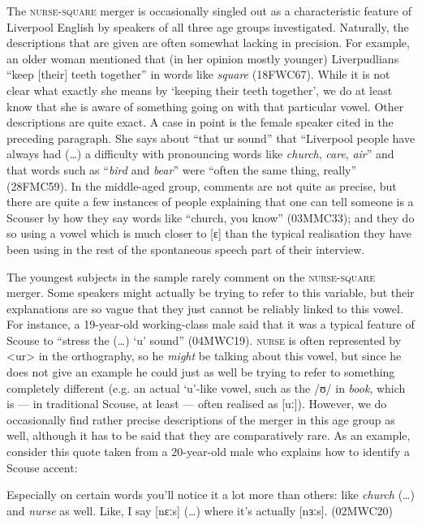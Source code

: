 The \textsc{nurse}-\textsc{square} merger is occasionally singled out as a characteristic feature of Liverpool English by speakers of all three age groups investigated.
Naturally, the descriptions that are given are often somewhat lacking in precision.
For example, an older woman mentioned that (in her opinion mostly younger) Liverpudlians ``keep [their] teeth together'' in words like \emph{square} (18FWC67).
While it is not clear what exactly she means by `keeping their teeth together', we do at least know that she is aware  of something going on with that particular vowel.
Other descriptions are quite exact.
A case in point is the female speaker cited in the preceding paragraph.
She says about ``that ur sound'' that  ``Liverpool people have always had (\ldots) a difficulty with pronouncing words like \emph{church}, \emph{care}, \emph{air}'' and that words such as ``\emph{bird} and \emph{bear}'' were ``often the same thing, really'' (28FMC59).
In the middle-aged group, comments are not quite as precise, but there are quite a few instances of people explaining that one can tell someone is a Scouser by how they say words like ``church, you know'' (03MMC33); and they do so using a vowel which is much closer to [ɛ] than the typical realisation they have been using in the rest of the spontaneous speech part of their interview.

The youngest subjects in the sample rarely comment on the \textsc{nurse}-\textsc{square} merger.
Some speakers might actually be trying to refer to this variable, but their explanations are so vague that they just cannot be reliably linked to this vowel.
For instance, a 19-year-old working-class male said that it was a typical feature of Scouse to ``stress the (\ldots) `u' sound'' (04MWC19).
\textsc{nurse} is often represented by <ur> in the orthography, so he \emph{might} be talking about this vowel, but since he does not give an example he could just as well be trying to refer to something completely different (e.g. an actual `u'-like vowel, such as the /ʊ/ in \emph{book}, which is --- in traditional Scouse, at least --- often realised as [uː]).
However, we do occasionally find rather precise descriptions of the merger in this age group as well, although it has to be said that they are comparatively rare.
As an example, consider this quote taken from a 20-year-old male who explains how to identify a Scouse accent:
\begin{example}
	Especially on certain words you'll notice it a lot more than others: like \emph{church} (\ldots) and \emph{nurse} as well.
	Like, I say [nɛːs] (\ldots) where it's actually [nɜːs]. (02MWC20)
\end{example}

